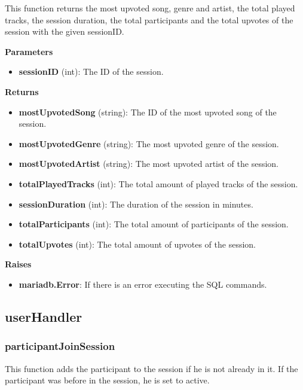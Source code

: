 \documentclass[oneside, ngerman]{sdqtechreport}
\begin{document}
This function returns the most upvoted song, genre and artist, the total played tracks, the session duration, the total participants and the total upvotes of the session with the given sessionID.

\textbf{Parameters}

\begin{itemize}
    \item \textbf{sessionID} (int): The ID of the session.
\end{itemize}

\textbf{Returns}

\begin{itemize}
    \item \textbf{mostUpvotedSong} (string): The ID of the most upvoted song of the session.
    \item \textbf{mostUpvotedGenre} (string): The most upvoted genre of the session.
    \item \textbf{mostUpvotedArtist} (string): The most upvoted artist of the session.
    \item \textbf{totalPlayedTracks} (int): The total amount of played tracks of the session.
    \item \textbf{sessionDuration} (int): The duration of the session in minutes.
    \item \textbf{totalParticipants} (int): The total amount of participants of the session.
    \item \textbf{totalUpvotes} (int): The total amount of upvotes of the session.
\end{itemize}

\textbf{Raises}

\begin{itemize}
    \item \textbf{mariadb.Error}: If there is an error executing the SQL commands.
\end{itemize}



\subsection{userHandler}

\subsubsection{participantJoinSession}

This function adds the participant to the session if he is not already in it. If the participant was before in the session, he is set to active.
\end{document}
